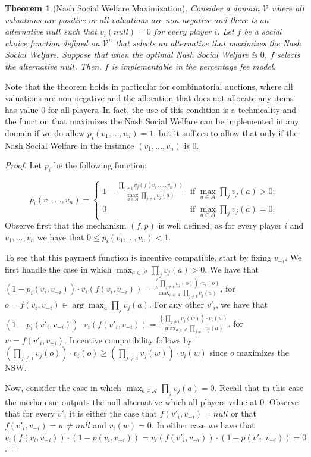 \documentclass{article}
\newtheorem{theorem}{Theorem}\newtheorem{lemma}[theorem]{Lemma}\newtheorem{proposition}[theorem]{Proposition}\newtheorem{corollary}[theorem]{Corollary}\newtheorem{definition}[theorem]{Definition}\newtheorem{claim}[theorem]{Claim}\newtheorem*{claim*}{Claim}\newenvironment{subproof}{\begin{proof}[Proof of claim]}{\end{proof}}
\newcommand{\cA}{{\mathcal A}}
\begin{document}
\begin{theorem}[Nash Social Welfare Maximization]
\label{thm:VCG}
Consider a domain $\mathcal V$ where all valuations are positive or all valuations are non-negative and there is an alternative $null$ such that $v_i(null)=0$ for every player $i$. Let $f$ be a social choice function defined on $\mathcal V^n$ that selects an alternative that maximizes the Nash Social Welfare. Suppose that when the optimal Nash Social Welfare is $0$, $f$ selects the alternative $null$. Then, $f$ is implementable in the percentage fee model.

\end{theorem}

Note that the theorem holds in particular for combinatorial auctions, where all valuations are non-negative and the allocation that does not allocate any items has value $0$ for all players. In fact, the use of this condition is a technicality and the function that maximizes the Nash Social Welfare can be implemented in any domain if we do allow $p_i(v_1,\ldots, v_n)=1$, but it suffices to allow that only if the Nash Social Welfare in the instance $(v_1,\ldots, v_n)$ is $0$.

\begin{proof}
Let $p_i$ be the following function:

$$
p_i(v_1,\ldots,v_n) = 
\begin{cases}
1 -  \frac{\prod_{j \neq i} v_j(f(v_1,\ldots, v_n))}{\max_{a \in \cA} \prod_{j \neq i} v_j(a)} & \text{if $\max_{a \in \cA} \prod_{j} v_j(a)> 0$};\\
0 & \text{if $\max_{a \in \cA} \prod_{j} v_j(a)= 0$}.
\end{cases}$$
Observe first that the mechanism $(f,p)$ is well defined, as for every player $i$ and $v_1,\ldots, v_n$ we have that $0\leq p_i(v_1,\ldots, v_n)<1$.

To see that this payment function is incentive compatible, start by fixing $v_{-i}$. We first handle the case in which $\max_{a \in \cA} \prod_{j} v_j(a)> 0$. We have that $(1-p_i(v_i, v_{-i}))\cdot v_i(f(v_i, v_{-i}))=\frac {\left(\prod_{j\neq i}v_j(o) \right)\cdot v_i(o)} {\max_{a \in \cA} \prod_{j \neq i} v_j(a)}$, for  $o=f(v_i,v_{-i})\in \arg\max_a \prod_{j}v_j(a)$. For any other $v'_i$, we have that $(1-p_i(v'_i, v_{-i}))\cdot v_i(f(v'_i, v_{-i}))=\frac {\left(\prod_{j\neq i}v_j(w) \right)\cdot v_i(w)} {\max_{a \in \cA} \prod_{j \neq i} v_j(a)}$, for $w=f(v'_i,v_{-i})$. Incentive compatibility follows by $\left(\prod_{j\neq i}v_j(o) \right)\cdot v_i(o) \geq \left(\prod_{j\neq i}v_j(w)\right)\cdot v_i(w)$ since $o$ maximizes the NSW. 

Now, consider the case in which $\max_{a \in \cA} \prod_{j} v_j(a)= 0$. Recall that in this case the mechanism outputs the null alternative which all players value at $0$. Observe that for every $v'_i$ it is either the case that $f(v'_i,v_{-i})=null$ or that $f(v'_i,v_{-i})=w\neq null$ and $v_i(w)=0$. In either case we have that $v_i(f(v_i,v_{-i})) \cdot(1-p(v_i,v_{-i}))= v_i(f(v'_i,v_{-i})) \cdot(1-p(v'_i,v_{-i}))=0$.





\end{proof}
\end{document}
